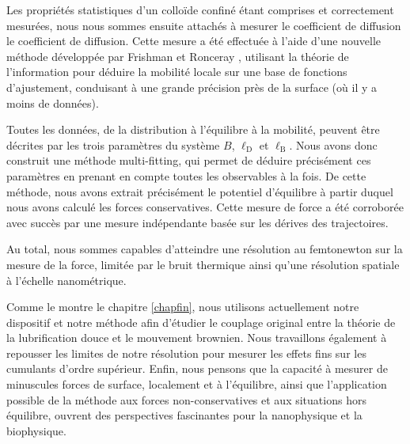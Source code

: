 Les propriétés statistiques d'un colloïde confiné étant comprises et correctement mesurées, nous nous sommes ensuite attachés à mesurer le coefficient de diffusion le coefficient de diffusion. Cette mesure a été effectuée à l'aide d'une nouvelle méthode développée par Frishman et Ronceray \cite{frishman_learning_2020}, utilisant la théorie de l'information pour déduire la mobilité locale sur une base de fonctions d'ajustement, conduisant à une grande précision près de la surface (où il y a moins de données). 

Toutes les données, de la distribution à l'équilibre à la mobilité, peuvent être décrites par les trois paramètres du système $B$, $\ell _\mathrm{D}$ et $\ell_\mathrm{B}$. Nous avons donc construit une méthode multi-fitting, qui permet de déduire précisément ces paramètres en prenant en compte toutes les observables à la fois. De cette méthode, nous avons extrait précisément le potentiel d'équilibre à partir duquel nous avons calculé les forces conservatives. Cette mesure de force a été corroborée avec succès par une mesure indépendante basée sur les dérives des trajectoires.

Au total, nous sommes capables d'atteindre une résolution au femtonewton sur la mesure de la force, limitée par le bruit thermique ainsi qu'une résolution spatiale à l'échelle nanométrique.

Comme le montre le chapitre \ref{chapfin}, nous utilisons actuellement notre dispositif et notre méthode afin d'étudier le couplage original entre la théorie de la lubrification douce et le mouvement brownien. Nous travaillons également à repousser les limites de notre résolution pour mesurer les effets fins sur les cumulants d'ordre supérieur. Enfin, nous pensons que la capacité à mesurer de minuscules forces de surface, localement et à l'équilibre, ainsi que l'application possible de la méthode aux forces non-conservatives et aux situations hors équilibre, ouvrent des perspectives fascinantes pour la nanophysique et la biophysique.


